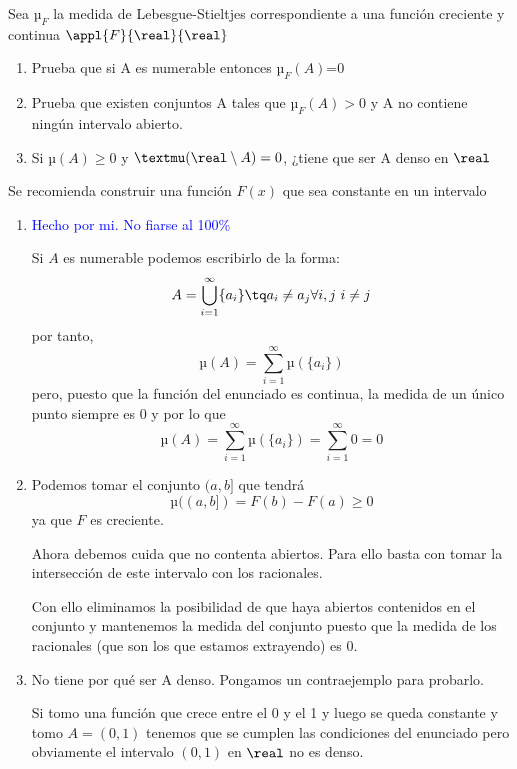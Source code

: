 \begin{problem}
Sea $µ_F$ la medida de Lebesgue-Stieltjes correspondiente a una función creciente y continua $\appl{F}{\real}{\real}$
\begin{enumerate}
\item Prueba que si A es numerable entonces $µ_F(A)$=0
\item Prueba que existen conjuntos A tales que $µ_F(A)> 0$ y A no contiene ningún intervalo abierto.
\item Si $µ(A)\geq 0$ y $µ(\real \setminus A) = 0$, ¿tiene que ser A denso en $\real$
\end{enumerate}
\obs Se recomienda construir una función $F(x)$ que sea constante en un intervalo
\solution

\begin{enumerate}
\item \textcolor{blue}{Hecho por mi. No fiarse al 100\%}

Si $A$ es numerable podemos escribirlo de la forma:
\[A = \bigcup_{i=1}^{\infty}\{a_i\} \tq a_i \neq a_j \forall i, j \ i \neq j\]
por tanto,
\[µ(A) = \sum_{i=1}^{\infty} µ(\{a_i\}) \]
pero, puesto que la función del enunciado es continua, la medida de un único punto siempre es 0 y por lo que
\[µ(A) = \sum_{i=1}^{\infty} µ(\{a_i\}) = \sum_{i=1}^{\infty}  0 = 0\]

\item Podemos tomar el conjunto $(a, b]$ que tendrá
\[µ((a,b]) = F(b)-F(a) \geq 0\]
ya que $F$ es creciente.

Ahora debemos cuida que no contenta abiertos. Para ello basta con tomar la intersección de este intervalo con los racionales.

Con ello eliminamos la posibilidad de que haya abiertos contenidos en el conjunto y mantenemos la medida del conjunto puesto que la medida de los racionales (que son los que estamos extrayendo) es 0.

\item No tiene por qué ser A denso. Pongamos un contraejemplo para probarlo.

Si tomo una función que crece entre el 0 y el 1 y luego se queda constante y tomo $A=(0,1)$ tenemos que se cumplen las condiciones del enunciado pero obviamente el intervalo $(0,1)$ en $\real$ no es denso.
\end{enumerate}
\end{problem}

